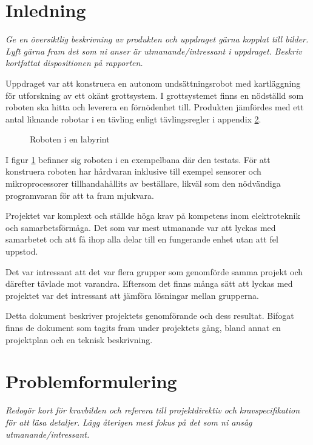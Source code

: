 \documentclass[11pt]{article}
\begin{document}
\begin{flushleft}
\section{Inledning}
\textit{Ge en översiktlig beskrivning av produkten och uppdraget gärna kopplat till bilder.}
\textit{Lyft gärna fram det som ni anser är utmanande/intressant i uppdraget.}
\textit{Beskriv kortfattat dispositionen på rapporten.}

Uppdraget var att konstruera en autonom undsättningsrobot med kartläggning för utforskning av ett okänt grottsystem. I grottsystemet finns en nödställd som roboten ska hitta och leverera en förnödenhet till. Produkten jämfördes med ett antal liknande robotar i en tävling enligt tävlingsregler i appendix \ref{}.

\begin{figure}[!htbp]
\centering
\noindent{}
	\caption{Roboten i en labyrint \label{scene}}	
\end{figure}

I figur \ref{scene} befinner sig roboten i en exempelbana där den testats. För att konstruera roboten har hårdvaran inklusive till exempel sensorer och mikroprocessorer tillhandahållits av beställare, likväl som den nödvändiga programvaran för att ta fram mjukvara.

Projektet var komplext och ställde höga krav på kompetens inom elektroteknik och samarbetsförmåga. Det som var mest utmanande var att lyckas med samarbetet och att få ihop alla delar till en fungerande enhet utan att fel uppstod. 

Det var intressant att det var flera grupper som genomförde samma projekt och därefter tävlade mot varandra. Eftersom det finns många sätt att lyckas med projektet var det intressant att jämföra lösningar mellan grupperna.

Detta dokument beskriver projektets genomförande och dess resultat. Bifogat finns de dokument som tagits fram under projektets gång, bland annat en projektplan och en teknisk beskrivning.



\pagebreak

\section{Problemformulering}
\textit{Redogör kort för kravbilden och referera till projektdirektiv och kravspecifikation för att läsa detaljer.}
\textit{Lägg återigen mest fokus på det som ni ansåg utmanande/intressant.}


\end{flushleft}
\end{document}
